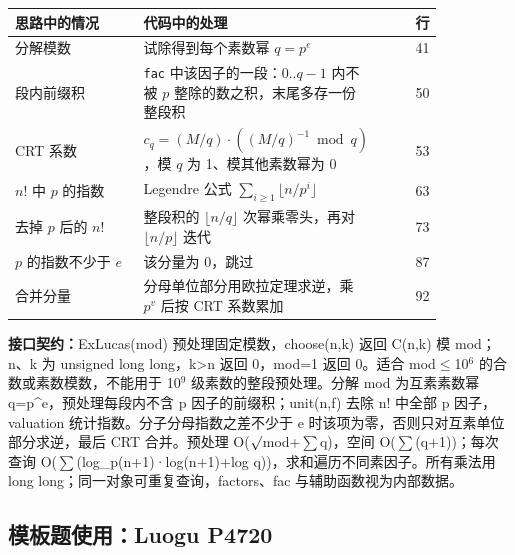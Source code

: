\begin{center}\small
\begin{tabular}{@{}p{0.30\linewidth}p{0.55\linewidth}r@{}}
\toprule
思路中的情况 & 代码中的处理 & 行\\
\midrule
分解模数 & 试除得到每个素数幂 $q=p^e$ & 41\\
段内前缀积 & \texttt{fac} 中该因子的一段：$0..q-1$ 内不被 $p$ 整除的数之积，末尾多存一份整段积 & 50\\
CRT 系数 & $c_q=(M/q)\cdot((M/q)^{-1}\bmod q)$，模 $q$ 为 1、模其他素数幂为 0 & 53\\
$n!$ 中 $p$ 的指数 & Legendre 公式 $\sum_{i\ge1}\lfloor n/p^i\rfloor$ & 63\\
去掉 $p$ 后的 $n!$ & 整段积的 $\lfloor n/q\rfloor$ 次幂乘零头，再对 $\lfloor n/p\rfloor$ 迭代 & 73\\
$p$ 的指数不少于 $e$ & 该分量为 0，跳过 & 87\\
合并分量 & 分母单位部分用欧拉定理求逆，乘 $p^v$ 后按 CRT 系数累加 & 92\\
\bottomrule
\end{tabular}
\end{center}



{\sloppy{}\noindent\textbf{接口契约：}ExLucas(mod) 预处理固定模数，choose(n,k) 返回 C(n,k) 模 mod；n、k 为 unsigned long long，k>n 返回 0，mod=1 返回 0。适合 mod$\le$10$^{6}$ 的合数或素数模数，不能用于 10$^{9}$ 级素数的整段预处理。分解 mod 为互素素数幂 q=p\textasciicircum{}e，预处理每段内不含 p 因子的前缀积；unit(n,f) 去除 n! 中全部 p 因子，valuation 统计指数。分子分母指数之差不少于 e 时该项为零，否则只对互素单位部分求逆，最后 CRT 合并。预处理 O($\sqrt{\vphantom x}$mod+$\sum$q)，空间 O($\sum$(q+1))；每次查询 O($\sum$(log\_p(n+1)·log(n+1)+log q))，求和遍历不同素因子。所有乘法用 long long；同一对象可重复查询，factors、fac 与辅助函数视为内部数据。\par}



\Needspace{209pt}



\Needspace{278pt}

\subsection*{模板题使用：Luogu P4720}

